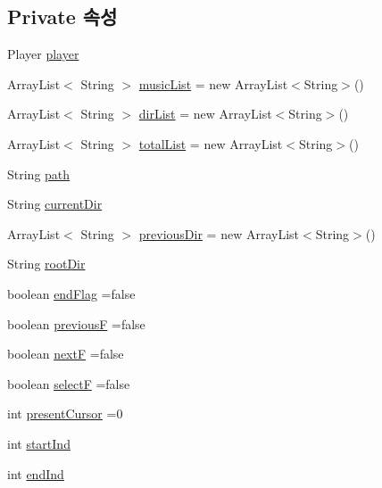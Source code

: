 \subsection*{Private 속성}
\begin{DoxyCompactItemize}
\item 
Player \hyperlink{classkr_1_1ac_1_1kookmin_1_1cs_1_1music_1_1_music_player_ae3ec295f2404ad30d9ff20208cda065e}{player}
\item 
Array\+List$<$ String $>$ \hyperlink{classkr_1_1ac_1_1kookmin_1_1cs_1_1music_1_1_music_player_a43bc24d44f1079340c3c9983c7df88a2}{music\+List} = new Array\+List$<$String$>$()
\item 
Array\+List$<$ String $>$ \hyperlink{classkr_1_1ac_1_1kookmin_1_1cs_1_1music_1_1_music_player_afb08be6c6500433b6fd4ae05eb3bc981}{dir\+List} = new Array\+List$<$String$>$()
\item 
Array\+List$<$ String $>$ \hyperlink{classkr_1_1ac_1_1kookmin_1_1cs_1_1music_1_1_music_player_ac7599b9b64999c9fcb1b7f1e6d32d188}{total\+List} = new Array\+List$<$String$>$()
\item 
String \hyperlink{classkr_1_1ac_1_1kookmin_1_1cs_1_1music_1_1_music_player_ae9763f1d531b65e0be29470b24704f4f}{path}
\item 
String \hyperlink{classkr_1_1ac_1_1kookmin_1_1cs_1_1music_1_1_music_player_a2614e5b1bf00c55b57e08354bcb6be19}{current\+Dir}
\item 
Array\+List$<$ String $>$ \hyperlink{classkr_1_1ac_1_1kookmin_1_1cs_1_1music_1_1_music_player_a30e3d7b8c44924c865dc3dd52e206809}{previous\+Dir} = new Array\+List$<$String$>$()
\item 
String \hyperlink{classkr_1_1ac_1_1kookmin_1_1cs_1_1music_1_1_music_player_a38c60f5f214d244f8da3ba7287d29a39}{root\+Dir}
\item 
boolean \hyperlink{classkr_1_1ac_1_1kookmin_1_1cs_1_1music_1_1_music_player_af90561018301ec011dff450ffc1273ae}{end\+Flag} =false
\item 
boolean \hyperlink{classkr_1_1ac_1_1kookmin_1_1cs_1_1music_1_1_music_player_a2cbe57c0e490a5d3e85adff6bc53e34e}{previous\+F} =false
\item 
boolean \hyperlink{classkr_1_1ac_1_1kookmin_1_1cs_1_1music_1_1_music_player_a5cbb89ee2337edc2838f332c8b5e5160}{next\+F} =false
\item 
boolean \hyperlink{classkr_1_1ac_1_1kookmin_1_1cs_1_1music_1_1_music_player_a75e8d73ae2ea36cdc3c38bde7a802ca7}{select\+F} =false
\item 
int \hyperlink{classkr_1_1ac_1_1kookmin_1_1cs_1_1music_1_1_music_player_aed823f56c3e5597d294d4f66a2d2fc54}{present\+Cursor} =0
\item 
int \hyperlink{classkr_1_1ac_1_1kookmin_1_1cs_1_1music_1_1_music_player_af154b8f09fc298427ccfb1d0e7c94447}{start\+Ind}
\item 
int \hyperlink{classkr_1_1ac_1_1kookmin_1_1cs_1_1music_1_1_music_player_ad162359e29d80d26914c27b6318901eb}{end\+Ind}
\end{DoxyCompactItemize}


